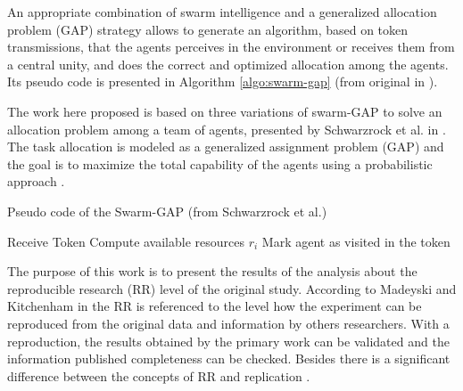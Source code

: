 An appropriate combination of swarm intelligence \cite{MOEA07} and a generalized allocation problem (GAP) strategy \cite{ferreira2007swarm} allows to generate an algorithm, based on token transmissions, that the agents perceives  in the environment or receives them from a central unity, and does the correct and optimized allocation among the agents. Its pseudo code is presented in Algorithm \ref{algo:swarm-gap} (from original in \cite{MAS07}). 

The work here proposed is based on three variations of swarm-GAP to solve an allocation problem among a team of agents, presented by Schwarzrock et al. in \cite{MAS07}. The task allocation is modeled as a generalized assignment problem (GAP) and the goal is to maximize the total capability of the agents using a probabilistic approach \cite{theraulaz1998response}.

\begin{algorithm}[!ht]
	\SetAlgoLined
	\DontPrintSemicolon
	\SetNlSkip{0.3em}	
	
	\caption{Pseudo code of the Swarm-GAP (from Schwarzrock et al.) }
	\label{algo:swarm-gap}
	Receive Token\; \label{line:receivetoken}
	Compute available resources $r_i $ \; \label{line:compute_r}
	Mark agent as visited in the token\; \label{line:marcavisitado}
\end{algorithm}


The purpose of this work is to present the results of the analysis about the reproducible research (RR) level of the original study. According to Madeyski and Kitchenham in \cite{exp02} the RR is referenced to the level how the experiment can be reproduced from the original data and information by others researchers. With a reproduction, the results obtained by the primary work can be validated and the information published completeness can be checked. Besides there is a significant difference between the concepts of RR and replication \cite{exp02} \cite{exp03}.

